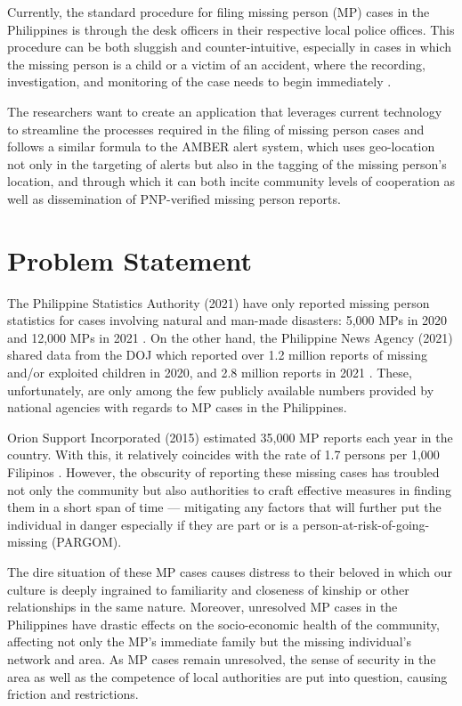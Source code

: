 Currently, the standard procedure for filing missing person (MP) cases in the Philippines is through the desk officers in their respective local police offices. This procedure can be both sluggish and counter-intuitive, especially in cases in which the missing person is a child or a victim of an accident, where the recording, investigation, and monitoring of the case needs to begin immediately \cite{NationalPoliceCommission}.

The researchers want to create an application that leverages current technology to streamline the processes required in the filing of missing person cases and follows a similar formula to the AMBER alert system, which uses geo-location not only in the targeting of alerts but also in the tagging of the missing person's location, and through which it can both incite community levels of cooperation as well as dissemination of PNP-verified missing person reports. 


\section{Problem Statement}
The Philippine Statistics Authority (2021) have only reported missing person statistics for cases involving natural and man-made disasters: 5,000 MPs in 2020 and 12,000 MPs in 2021 \cite{PSAOpenStat}. On the other hand, the Philippine News Agency (2021) shared data from the DOJ which reported over 1.2 million reports of missing and/or exploited children in 2020, and 2.8 million reports in 2021 \cite{pulta_2021}. These, unfortunately, are only among the few publicly available numbers provided by national agencies with regards to MP cases in the Philippines.

Orion Support Incorporated (2015) estimated 35,000 MP reports each year in the country. With this, it relatively coincides with the rate of 1.7 persons per 1,000 Filipinos \cite{orion_2021}. However, the obscurity of reporting these missing cases has troubled not only the community but also authorities to craft effective measures in finding them in a short span of time — mitigating any factors that will further put the individual in danger especially if they are part or is a person-at-risk-of-going-missing (PARGOM).

The dire situation of these MP cases causes distress to their beloved in which our culture is deeply ingrained to familiarity and closeness of kinship or other relationships in the same nature.  Moreover, unresolved MP cases in the Philippines have drastic effects on the socio-economic health of the community, affecting not only the MP’s immediate family but the missing individual’s network and area. As MP cases remain unresolved, the sense of security in the area as well as the competence of local authorities are put into question, causing friction and restrictions. 

